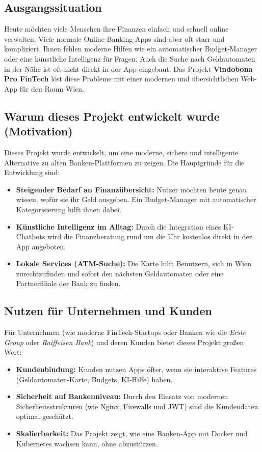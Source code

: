 \documentclass[11pt,a4paper]{article}
\begin{document}
\subsection{Ausgangssituation}
Heute möchten viele Menschen ihre Finanzen einfach und schnell online verwalten. Viele normale Online-Banking-Apps sind aber oft starr und kompliziert. Ihnen fehlen moderne Hilfen wie ein automatischer Budget-Manager oder eine künstliche Intelligenz für Fragen. Auch die Suche nach Geldautomaten in der Nähe ist oft nicht direkt in der App eingebaut. Das Projekt \textbf{Vindobona Pro FinTech} löst diese Probleme mit einer modernen und übersichtlichen Web-App für den Raum Wien.

\subsection{Warum dieses Projekt entwickelt wurde (Motivation)}
Dieses Projekt wurde entwickelt, um eine moderne, sichere und intelligente Alternative zu alten Banken-Plattformen zu zeigen. Die Hauptgründe für die Entwicklung sind:
\begin{itemize}
    \item \textbf{Steigender Bedarf an Finanzübersicht:} Nutzer möchten heute genau wissen, wofür sie ihr Geld ausgeben. Ein Budget-Manager mit automatischer Kategorisierung hilft ihnen dabei.
    \item \textbf{Künstliche Intelligenz im Alltag:} Durch die Integration eines KI-Chatbots wird die Finanzberatung rund um die Uhr kostenlos direkt in der App angeboten.
    \item \textbf{Lokale Services (ATM-Suche):} Die Karte hilft Benutzern, sich in Wien zurechtzufinden und sofort den nächsten Geldautomaten oder eine Partnerfiliale der Bank zu finden.
\end{itemize}

\subsection{Nutzen für Unternehmen und Kunden}
Für Unternehmen (wie moderne FinTech-Startups oder Banken wie die \textit{Erste Group} oder \textit{Raiffeisen Bank}) und deren Kunden bietet dieses Projekt großen Wert:
\begin{itemize}
    \item \textbf{Kundenbindung:} Kunden nutzen Apps öfter, wenn sie interaktive Features (Geldautomaten-Karte, Budgets, KI-Hilfe) haben.
    \item \textbf{Sicherheit auf Bankenniveau:} Durch den Einsatz von modernen Sicherheitsstrukturen (wie Nginx, Firewalls und JWT) sind die Kundendaten optimal geschützt.
    \item \textbf{Skalierbarkeit:} Das Projekt zeigt, wie eine Banken-App mit Docker und Kubernetes wachsen kann, ohne abzustürzen.
\end{itemize}
\end{document}
